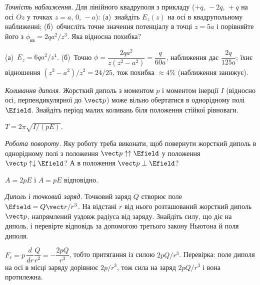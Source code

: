 \begin{problem}\label{prb:QuadrupoleAccuracy}
	\emph{Точність наближення.}
	Для лінійного квадруполя з прикладу ($+q,\,-2q,\,+q$ на осі $Oz$ у точках $z=a,\,0,\,-a$): (а)~знайдіть $E_z(z)$ на осі в квадрупольному наближенні; (б)~обчисліть точне значення потенціалу в точці $z=5a$ і порівняйте його з $\phi_{\text{кв}}=2qa^2/z^3$. Яка відносна похибка?
	\begin{solution}
		(а)~$E_z=6qa^2/z^4$. (б)~Точно $\phi=\dfrac{2qa^2}{z(z^2-a^2)}=\dfrac{q}{60a}$, наближення дає $\dfrac{2q}{125a}$; їхнє відношення $(z^2-a^2)/z^2=24/25$, тож похибка $\approx4\%$ (наближення занижує).
	\end{solution}
\end{problem}


\begin{problem}\label{prb:DipoleOscillations}
	\emph{Коливання диполя.}
	Жорсткий диполь з моментом $p$ і моментом інерції $I$ (відносно осі, перпендикулярної до $\vect p$) може вільно обертатися в однорідному полі $\Efield$. Знайдіть період малих коливань біля положення стійкої рівноваги.
	\begin{solution}
		$T=2\pi\sqrt{I/(pE)}$.
	\end{solution}
\end{problem}

\begin{problem}\label{prb:DipoleRotationWork}
	\emph{Робота повороту.}
	Яку роботу треба виконати, щоб повернути жорсткий диполь в однорідному полі з положення $\vect p\uparrow\uparrow\Efield$ у положення $\vect p\uparrow\downarrow\Efield$? А в положення $\vect p\perp\Efield$?
	\begin{solution}
		$A=2pE$ і $A=pE$ відповідно.
	\end{solution}
\end{problem}

\begin{problem}\label{prb:DipoleAndCharge}
	\emph{Диполь і точковий заряд.}
	Точковий заряд $Q$ створює поле $\Efield=Q\vect r/r^3$. На відстані $r$ від нього розташований жорсткий диполь $\vect p$, напрямлений уздовж радіуса від заряду. Знайдіть силу, що діє на диполь, і перевірте відповідь за допомогою третього закону Ньютона й поля диполя.
	\begin{solution}
		$F_r=p\,\dfrac{d}{dr}\dfrac{Q}{r^2}=-\dfrac{2pQ}{r^3}$, тобто притягання із силою $2pQ/r^3$. Перевірка: поле диполя на осі в місці заряду дорівнює $2p/r^3$, тож сила на заряд $2pQ/r^3$ і вона протилежна.
	\end{solution}
\end{problem}

